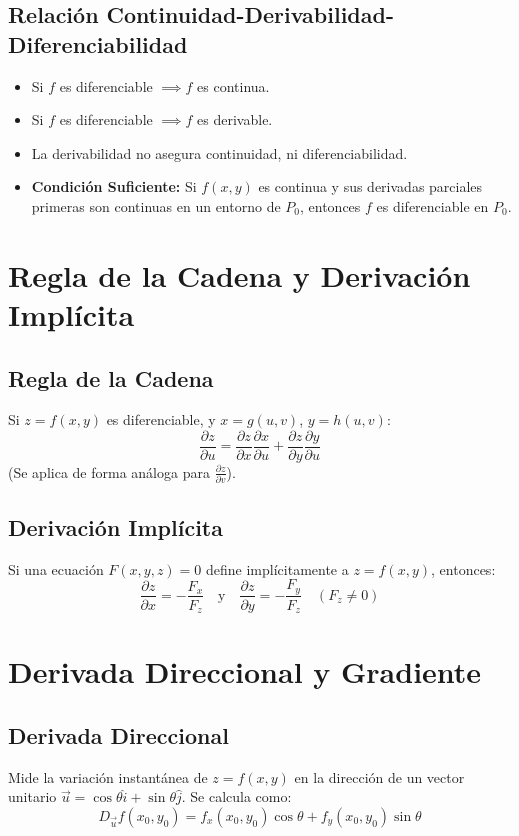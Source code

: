 \documentclass[a4paper,12pt]{article}
\begin{document}
\subsection{Relación Continuidad-Derivabilidad-Diferenciabilidad}
\begin{itemize}
    \item Si $f$ es diferenciable $\implies f$ es continua.
    \item Si $f$ es diferenciable $\implies f$ es derivable.
    \item La derivabilidad no asegura continuidad, ni diferenciabilidad.
    \item \textbf{Condición Suficiente:} Si $f(x,y)$ es continua y sus derivadas parciales primeras son continuas en un entorno de $P_0$, entonces $f$ es diferenciable en $P_0$.
\end{itemize}

\section{Regla de la Cadena y Derivación Implícita}

\subsection{Regla de la Cadena}
Si $z = f(x,y)$ es diferenciable, y $x = g(u,v)$, $y = h(u,v)$:
$$ \frac{\partial z}{\partial u} = \frac{\partial z}{\partial x}\frac{\partial x}{\partial u} + \frac{\partial z}{\partial y}\frac{\partial y}{\partial u} $$
(Se aplica de forma análoga para $\frac{\partial z}{\partial v}$).

\subsection{Derivación Implícita}
Si una ecuación $F(x,y,z) = 0$ define implícitamente a $z = f(x,y)$, entonces:
$$ \frac{\partial z}{\partial x} = -\frac{F_x}{F_z} \quad \text{y} \quad \frac{\partial z}{\partial y} = -\frac{F_y}{F_z} \quad (F_z \neq 0) $$

\section{Derivada Direccional y Gradiente}

\subsection{Derivada Direccional}
Mide la variación instantánea de $z = f(x,y)$ en la dirección de un vector unitario $\vec{u} = \cos\theta \hat{i} + \sin\theta \hat{j}$. Se calcula como:
$$ D_{\vec{u}}f(x_0,y_0) = f_x(x_0,y_0)\cos\theta + f_y(x_0,y_0)\sin\theta $$
\end{document}
